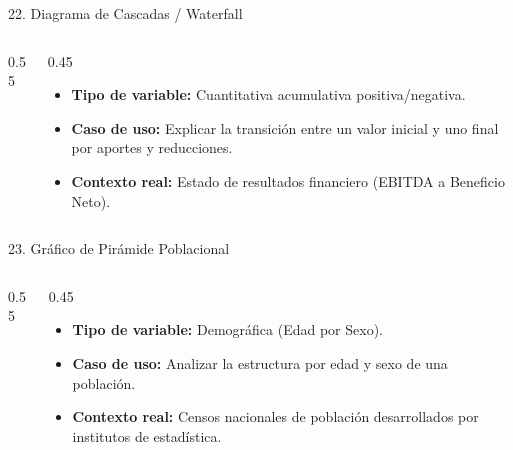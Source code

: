 \documentclass[aspectratio=169,10pt]{beamer}
\begin{document}
\begin{frame}{22. Diagrama de Cascadas / Waterfall}
\begin{columns}
\begin{column}{0.55\textwidth}
\end{column}
\begin{column}{0.45\textwidth}
\begin{itemize}\small
\item \textbf{Tipo de variable:} Cuantitativa acumulativa positiva/negativa.
\item \textbf{Caso de uso:} Explicar la transición entre un valor inicial y uno final por aportes y reducciones.
\item \textbf{Contexto real:} Estado de resultados financiero (EBITDA a Beneficio Neto).
\end{itemize}
\end{column}
\end{columns}
\end{frame}

\begin{frame}{23. Gráfico de Pirámide Poblacional}
\begin{columns}
\begin{column}{0.55\textwidth}
\end{column}
\begin{column}{0.45\textwidth}
\begin{itemize}\small
\item \textbf{Tipo de variable:} Demográfica (Edad por Sexo).
\item \textbf{Caso de uso:} Analizar la estructura por edad y sexo de una población.
\item \textbf{Contexto real:} Censos nacionales de población desarrollados por institutos de estadística.
\end{itemize}
\end{column}
\end{columns}
\end{frame}
\end{document}
